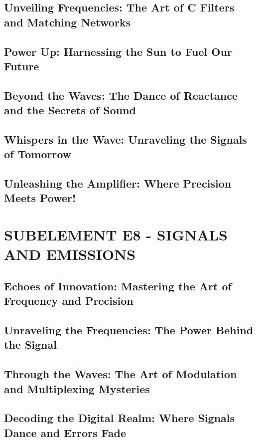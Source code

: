 \documentclass[12pt]{book}
\begin{document}
\section{Unveiling Frequencies: The Art of C Filters and Matching Networks}
\section{Power Up: Harnessing the Sun to Fuel Our Future}
\section{Beyond the Waves: The Dance of Reactance and the Secrets of Sound}
\section{Whispers in the Wave: Unraveling the Signals of Tomorrow}
\section{Unleashing the Amplifier: Where Precision Meets Power!}
\chapter{SUBELEMENT E8 - SIGNALS AND EMISSIONS}
\section{Echoes of Innovation: Mastering the Art of Frequency and Precision}
\section{Unraveling the Frequencies: The Power Behind the Signal}











\section{Through the Waves: The Art of Modulation and Multiplexing Mysteries}
\section{Decoding the Digital Realm: Where Signals Dance and Errors Fade}
\end{document}
